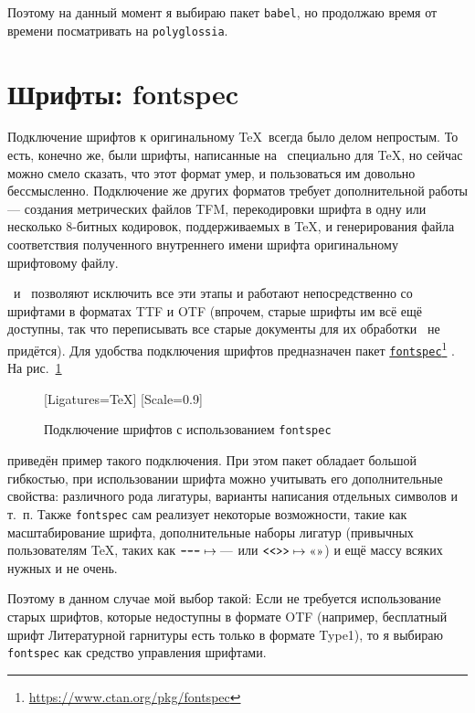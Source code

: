 \documentclass[a4paper,12pt]{article}
\newcommand\foothref[2]{%
  \href{#1}{#2}\footnote{\url{#1}}%
}
\newcommand\package[1]{\texttt{#1}}
\begin{document}
Поэтому на данный момент я выбираю пакет \package{babel}, но продолжаю время
от времени посматривать на \package{polyglossia}.

\section{Шрифты: fontspec}
Подключение шрифтов к оригинальному \TeX\ всегда было делом непростым.
То есть, конечно же, были шрифты, написанные на \METAFONT\ специально для
\TeX, но сейчас можно смело сказать, что этот формат умер, и пользоваться
им довольно бессмысленно. Подключение же других форматов требует
дополнительной работы --- создания метрических файлов TFM, перекодировки
шрифта в одну или несколько 8-битных кодировок, поддерживаемых в \TeX,
и генерирования файла соответствия полученного внутреннего имени шрифта
оригинальному шрифтовому файлу.

\XeTeX\ и \LuaTeX\ позволяют исключить все эти этапы и работают
непосредственно со шрифтами в форматах TTF и OTF (впрочем, старые
шрифты им всё ещё доступны, так что переписывать все старые документы для
их обработки \LuaLaTeX\ не придётся). Для удобства подключения шрифтов
предназначен пакет \foothref{https://www.ctan.org/pkg/fontspec}{\package{fontspec}}.
На рис.~\ref{fontspec1}
\begin{figure}[tp]
\begin{latexcode}
\usepackage{fontspec}
\setmainfont{STIX Two Text}[Ligatures=TeX]
\setmonofont{PT Mono}[Scale=0.9]
\end{latexcode}
\caption{Подключение шрифтов с использованием
\package{fontspec}}\label{fontspec1}
\end{figure}
приведён пример такого подключения. При этом пакет обладает большой
гибкостью, при использовании шрифта можно учитывать его дополнительные
свойства: различного рода лигатуры, варианты написания отдельных
символов и т.~п. Также \package{fontspec} сам реализует некоторые
возможности, такие как масштабирование шрифта, дополнительные наборы
лигатур (привычных пользователям \TeX, таких как
$\verb|---|\mapsto\text{---}$ или $\verb|<<>>|\mapsto\text{<<>>}$)
и ещё массу всяких нужных и не очень.

Поэтому в данном случае мой выбор такой: Если не требуется использование
старых шрифтов, которые недоступны в формате OTF (например, бесплатный
шрифт Литературной гарнитуры есть только в формате Type1), то я выбираю
\package{fontspec} как средство управления шрифтами.
\end{document}
